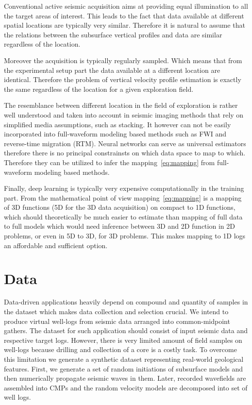 \documentclass[paper,twocolomn]{geophysics}
\begin{document}
Conventional active seismic acquisition aims at providing equal illumination to all the target areas of interest. This leads to the fact that data available at different spatial locations are typically very similar. Therefore it is natural to assume that the relations between the subsurface vertical profiles and data are similar regardless of the location. 

Moreover the acquisition is typically regularly sampled. Which means that from the experimental setup part the data available at a different location are identical. Therefore the problem of vertical velocity profile estimation is exactly the same regardless of the location for a given exploration field.

The resemblance between different location in the field of exploration is rather well understood and taken into account in seismic imaging methods that rely on simplified media assumptions, such as stacking. It however can not be easily incorporated into full-waveform modeling based methods such as FWI and reverse-time migration (RTM).   
%
Neural networks can serve as universal estimators therefore there is no principal constrainsts on which data space to map to which. Therefore they can be utilized to infer the mapping~\eqref{eq:mapping} from full-waveform modeling based methods. 

Finally, deep learning is typically very expensive computationally in the training part. From the mathematical point of view mapping~\eqref{eq:mapping} is a mapping of 3D functions (5D for the 3D data acquisition) on compact to 1D functions, which should theoretically be much easier to estimate than mapping of full data to full models which would need inference between 3D and 2D function in 2D problems, or even in 5D to 3D, for 3D problems. This makes mapping to 1D logs an affordable and sufficient option.


\section{Data}
Data-driven applications heavily depend on compound and quantity of samples in the dataset which makes data collection and selection crucial. 
%
We intend to produce virtual well-logs from seismic data arranged into common-midpoint gathers. The dataset for such application should consist of input seismic data and respective target logs. However, there is very limited amount of field samples on well-logs because drilling and collection of a core is a costly task. 
%
To overcome this limitation we generate a synthetic dataset representing real-world geological features. First, we generate a set of random initiations of subsurface models and then numerically propagate seismic waves in them. Later, recorded wavefields are assembled into CMPs and the random velocity models are decomposed into set of well logs.
\end{document}
